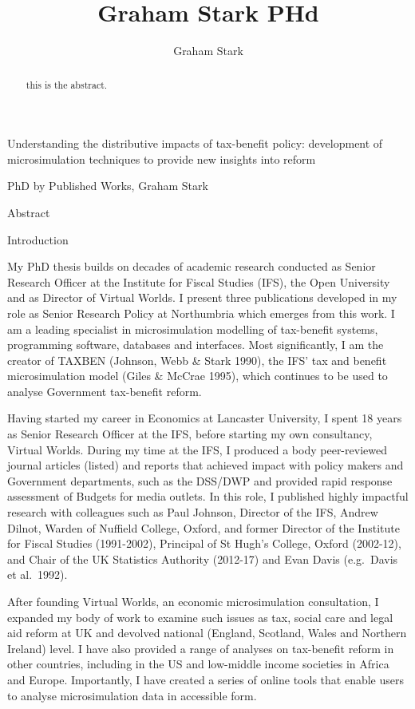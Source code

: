 \documentclass[
  letterpaper,
  DIV=11,
  numbers=noendperiod]{scrartcl}
\title{Graham Stark PHd}
\author{Graham Stark}
\date{}
\begin{document}
\maketitle
\begin{abstract}
this is the abstract.
\end{abstract}

Understanding the distributive impacts of tax-benefit policy:
development of microsimulation techniques to provide new insights into
reform

PhD by Published Works, Graham Stark

Abstract

Introduction

My PhD thesis builds on decades of academic research conducted as Senior
Research Officer at the Institute for Fiscal Studies (IFS), the Open
University and as Director of Virtual Worlds. I present three
publications developed in my role as Senior Research Policy at
Northumbria which emerges from this work. I am a leading specialist in
microsimulation modelling of tax-benefit systems, programming software,
databases and interfaces. Most significantly, I am the creator of TAXBEN
(Johnson, Webb \& Stark 1990), the IFS' tax and benefit microsimulation
model (Giles \& McCrae 1995), which continues to be used to analyse
Government tax-benefit reform.

Having started my career in Economics at Lancaster University, I spent
18 years as Senior Research Officer at the IFS, before starting my own
consultancy, Virtual Worlds. During my time at the IFS, I produced a
body peer-reviewed journal articles (listed) and reports that achieved
impact with policy makers and Government departments, such as the
DSS/DWP and provided rapid response assessment of Budgets for media
outlets. In this role, I published highly impactful research with
colleagues such as Paul Johnson, Director of the IFS, Andrew Dilnot,
Warden of Nuffield College, Oxford, and former Director of the Institute
for Fiscal Studies (1991-2002), Principal of St Hugh's College, Oxford
(2002-12), and Chair of the UK Statistics Authority (2012-17) and Evan
Davis (e.g.~Davis et al.~1992).

After founding Virtual Worlds, an economic microsimulation consultation,
I expanded my body of work to examine such issues as tax, social care
and legal aid reform at UK and devolved national (England, Scotland,
Wales and Northern Ireland) level. I have also provided a range of
analyses on tax-benefit reform in other countries, including in the US
and low-middle income societies in Africa and Europe. Importantly, I
have created a series of online tools that enable users to analyse
microsimulation data in accessible form.
\end{document}
